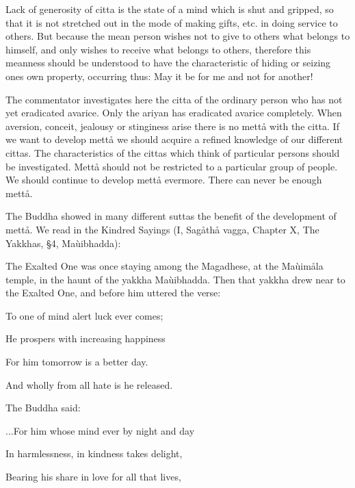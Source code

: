 \documentclass[12pt,twoside]{article}
\begin{document}
{\textasciigrave}{\textasciigrave}Lack of generosity of
citta{\textquotesingle}{\textquotesingle} is the state of a mind which
is shut and gripped, so that it is not stretched out in the mode of
making gifts, etc. in doing service to others. But because the mean
person wishes not to give to others what belongs to himself, and only
wishes to receive what belongs to others, therefore this meanness
should be understood to have the characteristic of hiding or seizing
one{\textquotesingle}s own property, occurring thus:
{\textasciigrave}{\textasciigrave}May it be for me and not for
another!{\textquotesingle}{\textquotesingle}


\bigskip

The commentator investigates here the citta of the ordinary person who
has not yet eradicated avarice. Only the ariyan has eradicated avarice
completely. When aversion, conceit, jealousy or stinginess arise there
is no mett{\aa} with the citta. If we want to develop mett{\aa} we
should acquire a refined knowledge of our different cittas. The
characteristics of the cittas which think of particular persons should
be investigated. Mett{\aa} should not be restricted to a particular
group of people. We should continue to develop mett{\aa} evermore.
There can never be enough mett{\aa}. 

The Buddha showed in many different suttas the benefit of the
development of mett{\aa}. We read in the Kindred Sayings (I,
Sag{\aa}th{\aa} vagga, Chapter X, The Yakkhas, {\S}4, Ma\`uibhadda):


\bigskip

The Exalted One was once staying among the Magadhese, at the
Ma\`uim{\aa}la temple, in the haunt of the yakkha Ma\`uibhadda. Then
that yakkha drew near to the Exalted One, and before him uttered the
verse: 

To one of mind alert luck ever comes;

He prospers with increasing happiness

For him tomorrow is a better day. 

And wholly from all hate is he released. 


\bigskip

The Buddha said:


\bigskip

...For him whose mind ever by night and day

In harmlessness, in kindness takes delight, 

Bearing his share in love for all that lives, 
\end{document}
